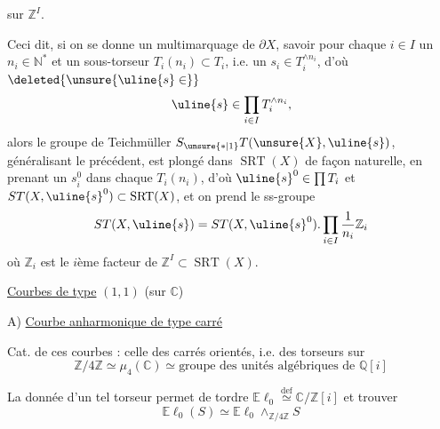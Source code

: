  sur $\mathbb Z^I$.


Ceci dit, si on se donne un
multimarquage de $\partial X$, savoir pour
chaque $i\in I$ un $n_i\in\mathbb N^*$ et un
sous-torseur
$T_i(n_i)\subset T_i$,
 i.e.
un $s_i\in T_i^{\wedge n_i}$, d'où
$\deleted{\unsure{\uline{s}\in}}$
\[
\uline{s}\in\prod_{i\in I}T_i^{\wedge n_i},
\]
alors le groupe de Teichmüller 
$S_{\unsure{*|1}}T(\unsure{X},\uline{s})$,
généralisant le précédent, est
plongé dans $\operatorname{SRT}(X)$ de façon naturelle,
en prenant un $s_i^0$ dans chaque $T_i(n_i)$, d'où
$\uline{s}^0\in\prod T_i$ et
$ST(X,\uline{s}^0)\subset\operatorname{SRT}(X)$,
et on prend le ss-groupe
\[
ST(X,\uline{s})=ST(X,\uline{s}^0).
\prod_{i\in I}\frac1{n_i}\mathbb Z_i
\]
où $\mathbb Z_i$ est le $i$ème facteur de
$\mathbb Z^I\subset\operatorname{SRT}(X)$.


\uline{Courbes  de type} $(1,1)$ (sur $\mathbb C$)

A) \uline{Courbe  anharmonique de type carré}

Cat. de ces courbes  : celle des carrés
 orientés, i.e. des torseurs sur
\[
\mathbb Z/4\mathbb Z\simeq\mu_4(\mathbb C)\simeq
\text{groupe des unités algébriques de }\mathbb Q[i]
\]

La donnée d'un tel torseur  permet de tordre
$\mathbb E\ell_0\overset{\mathrm{def}}\simeq
\mathbb C/\mathbb Z[i]$ et trouver
\[
\mathbb E\ell_0(S)\simeq\mathbb E\ell_0
\mathbin{\wedge}_{\mathbb Z/4\mathbb Z}S
\]


